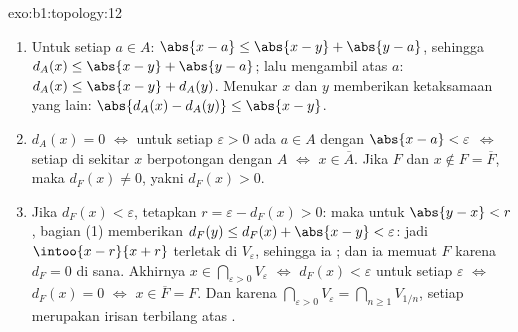 \begin{solution}{exo:b1:topology:12}
\begin{enumerate}
  \item Untuk setiap $a \in A$: $\abs{x - a} \leq \abs{x - y} +
        \abs{y - a}$, sehingga $d_A(x) \leq \abs{x - y} + \abs{y - a}$;
        lalu mengambil  atas $a$: $d_A(x) \leq \abs{x - y} +
        d_A(y)$. Menukar $x$ dan $y$ memberikan ketaksamaan
        yang lain: $\abs{d_A(x) - d_A(y)} \leq \abs{x - y}$.
  \item $d_A(x) = 0$ $\iff$ untuk setiap $\varepsilon > 0$ ada
        $a \in A$ dengan $\abs{x - a} < \varepsilon$ $\iff$ setiap
         di sekitar $x$ berpotongan dengan $A$ $\iff$ $x \in \overline A$.
        Jika $F$  dan $x \notin F = \overline F$, maka
        $d_F(x) \neq 0$, yakni $d_F(x) > 0$.
  \item Jika $d_F(x) < \varepsilon$, tetapkan $r = \varepsilon -
        d_F(x) > 0$: maka untuk $\abs{y - x} < r$, bagian (1) memberikan
        $d_F(y) \leq d_F(x) + \abs{x - y} < \varepsilon$: jadi
         $\intoo{x - r}{x + r}$ terletak di $V_\varepsilon$,
        sehingga ia ; dan ia memuat $F$ karena $d_F = 0$
        di sana. Akhirnya $x \in \bigcap_{\varepsilon>0}
        V_\varepsilon$ $\iff$ $d_F(x) < \varepsilon$ untuk setiap
        $\varepsilon$ $\iff$ $d_F(x) = 0$ $\iff$ $x \in \overline
        F = F$. Dan karena $\bigcap_{\varepsilon > 0} V_\varepsilon =
        \bigcap_{n \geq 1} V_{1/n}$, setiap  merupakan
        irisan terbilang atas .
\end{enumerate}
\end{solution}

